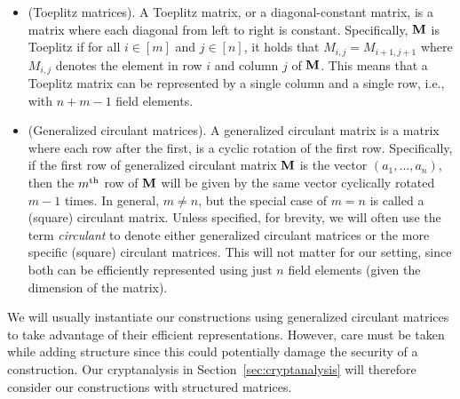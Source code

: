 \begin{itemize}
    \item (Toeplitz matrices).
    A Toeplitz matrix, or a diagonal-constant matrix, is a matrix where each diagonal from left to right is constant. Specifically, $\mat{M}$ is Toeplitz if for all $i \in [m]$ and $j \in [n]$, it holds that $M_{i,j} = M_{i+1, j+1}$ where $M_{i,j}$ denotes the element in row $i$ and column $j$ of $\mat{M}$. This means that a Toeplitz matrix can be represented by a single column and a single row, i.e., with $n + m - 1$ field elements.

    \item (Generalized circulant matrices). 
    A generalized circulant matrix is a matrix where each row after the first, is a cyclic rotation of the first row. Specifically, if the first row of generalized circulant matrix $\mat{M}$ is the vector $(a_1, \dots, a_n)$, then the $m^{\textnormal{th}}$ row of $\mat{M}$ will be given by the same vector cyclically rotated $m-1$ times. In general, $m \neq n$, but the special case of $m = n$ is called a (square) circulant matrix. Unless specified, for brevity, we will often use the term \textit{circulant} to denote either generalized circulant matrices or the more specific (square) circulant matrices. This will not matter for our setting, since both can be efficiently represented using just $n$ field elements (given the dimension of the matrix).
\end{itemize}

We will usually instantiate our constructions using generalized circulant matrices to take advantage of their efficient representations. However, care must be taken while adding structure since this could potentially damage the security of a construction. Our cryptanalysis in Section~\ref{sec:cryptanalysis} will therefore consider our constructions with structured matrices.
